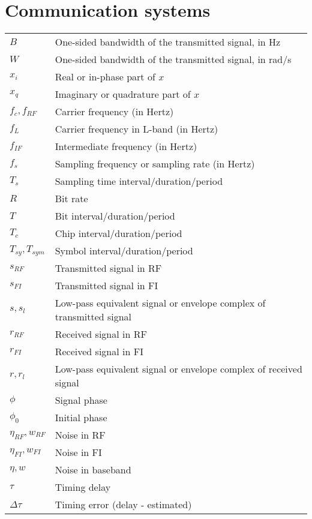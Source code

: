 \documentclass{article}
\begin{document}
\section{Communication systems}
\begin{xltabular}{\textwidth}{XX}
    \(B\) & One-sided bandwidth of the transmitted signal, in Hz\\
    \(W\) & One-sided bandwidth of the transmitted signal, in rad/s\\
    \(x_i\) & Real or in-phase part of \(x\)\\
    \(x_q\) & Imaginary or quadrature part of \(x\)\\
    \(f_c, f_{RF}\) & Carrier frequency (in Hertz)\\
    \(f_L\) & Carrier frequency in L-band (in Hertz)\\
    \(f_{IF}\) & Intermediate frequency (in Hertz)\\
    \(f_{s}\) & Sampling frequency or sampling rate (in Hertz)\\
    \(T_{s}\) & Sampling time interval/duration/period\\
    \(R\) & Bit rate\\
    \(T\) & Bit interval/duration/period\\
    \(T_c\) & Chip interval/duration/period\\
    \(T_{sy}, T_{sym}\) & Symbol interval/duration/period\\
    \(s_{RF}\) & Transmitted signal in RF\\
    \(s_{FI}\) & Transmitted signal in FI\\
    \(s, s_l\) & Low-pass equivalent signal or envelope complex of transmitted signal\\
    \(r_{RF}\) & Received signal in RF\\
    \(r_{FI}\) & Received signal in FI\\
    \(r, r_l\) & Low-pass equivalent signal or envelope complex of received signal\\
    \(\phi\) & Signal phase\\
    \(\phi_0\) & Initial phase\\
    \(\eta_{RF}, w_{RF}\) & Noise in RF\\
    \(\eta_{FI}, w_{FI}\) & Noise in FI\\
    \(\eta, w\) & Noise in baseband\\
    \(\tau\) & Timing delay \\
    \(\Delta\tau\) & Timing error (delay - estimated) \\

\end{xltabular}
\end{document}
